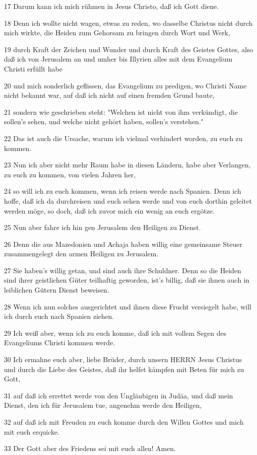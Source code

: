 \par 17 Darum kann ich mich rühmen in Jesus Christo, daß ich Gott diene.
\par 18 Denn ich wollte nicht wagen, etwas zu reden, wo dasselbe Christus nicht durch mich wirkte, die Heiden zum Gehorsam zu bringen durch Wort und Werk,
\par 19 durch Kraft der Zeichen und Wunder und durch Kraft des Geistes Gottes, also daß ich von Jerusalem an und umher bis Illyrien alles mit dem Evangelium Christi erfüllt habe
\par 20 und mich sonderlich geflissen, das Evangelium zu predigen, wo Christi Name nicht bekannt war, auf daß ich nicht auf einen fremden Grund baute,
\par 21 sondern wie geschrieben steht: "Welchen ist nicht von ihm verkündigt, die sollen's sehen, und welche nicht gehört haben, sollen's verstehen."
\par 22 Das ist auch die Ursache, warum ich vielmal verhindert worden, zu euch zu kommen.
\par 23 Nun ich aber nicht mehr Raum habe in diesen Ländern, habe aber Verlangen, zu euch zu kommen, von vielen Jahren her,
\par 24 so will ich zu euch kommen, wenn ich reisen werde nach Spanien. Denn ich hoffe, daß ich da durchreisen und euch sehen werde und von euch dorthin geleitet werden möge, so doch, daß ich zuvor mich ein wenig an euch ergötze.
\par 25 Nun aber fahre ich hin gen Jerusalem den Heiligen zu Dienst.
\par 26 Denn die aus Mazedonien und Achaja haben willig eine gemeinsame Steuer zusammengelegt den armen Heiligen zu Jerusalem.
\par 27 Sie haben's willig getan, und sind auch ihre Schuldner. Denn so die Heiden sind ihrer geistlichen Güter teilhaftig geworden, ist's billig, daß sie ihnen auch in leiblichen Gütern Dienst beweisen.
\par 28 Wenn ich nun solches ausgerichtet und ihnen diese Frucht versiegelt habe, will ich durch euch nach Spanien ziehen.
\par 29 Ich weiß aber, wenn ich zu euch komme, daß ich mit vollem Segen des Evangeliums Christi kommen werde.
\par 30 Ich ermahne euch aber, liebe Brüder, durch unsern HERRN Jesus Christus und durch die Liebe des Geistes, daß ihr helfet kämpfen mit Beten für mich zu Gott,
\par 31 auf daß ich errettet werde von den Ungläubigen in Judäa, und daß mein Dienst, den ich für Jerusalem tue, angenehm werde den Heiligen,
\par 32 auf daß ich mit Freuden zu euch komme durch den Willen Gottes und mich mit euch erquicke.
\par 33 Der Gott aber des Friedens sei mit euch allen! Amen.

